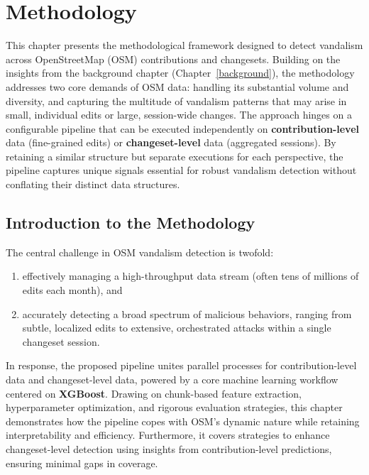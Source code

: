 \documentclass[
    13pt, %
    a4paper, %
    listof=totoc, %
    bibliography=totoc, %
    index=totoc, %
    headsepline
]{scrreprt}
\begin{document}
\chapter{Methodology}
\label{chap:methods}

\noindent
This chapter presents the methodological framework designed to detect vandalism across OpenStreetMap (OSM) contributions and changesets. Building on the insights from the background chapter (Chapter~\ref{background}), the methodology addresses two core demands of OSM data: handling its substantial volume and diversity, and capturing the multitude of vandalism patterns that may arise in small, individual edits or large, session-wide changes. The approach hinges on a configurable pipeline that can be executed independently on \textbf{contribution-level} data (fine-grained edits) or \textbf{changeset-level} data (aggregated sessions). By retaining a similar structure but separate executions for each perspective, the pipeline captures unique signals essential for robust vandalism detection without conflating their distinct data structures.

\section{Introduction to the Methodology}
\label{sec:introduction_methods}

The central challenge in OSM vandalism detection is twofold:
\begin{enumerate}[label=(\arabic*)]
    \item effectively managing a high-throughput data stream (often tens of millions of edits each month), and
    \item accurately detecting a broad spectrum of malicious behaviors, ranging from subtle, localized edits to extensive, orchestrated attacks within a single changeset session.
\end{enumerate}

In response, the proposed pipeline unites parallel processes for contribution-level data and changeset-level data, powered by a core machine learning workflow centered on \textbf{XGBoost}. Drawing on chunk-based feature extraction, hyperparameter optimization, and rigorous evaluation strategies, this chapter demonstrates how the pipeline copes with OSM’s dynamic nature while retaining interpretability and efficiency. Furthermore, it covers strategies to enhance changeset-level detection using insights from contribution-level predictions, ensuring minimal gaps in coverage.
\end{document}
